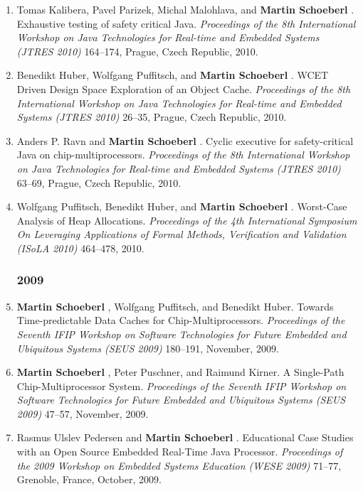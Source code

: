 \begin{enumerate}
\item Tomas Kalibera, Pavel Parizek, Michal Malohlava, and {\bf Martin Schoeberl }.
 Exhaustive testing of safety critical Java.
 \emph{Proceedings of the 8th International Workshop on Java Technologies for Real-time and Embedded Systems (JTRES 2010)} 164--174, Prague, Czech Republic, 2010.

\item Benedikt Huber, Wolfgang Puffitsch, and {\bf Martin Schoeberl }.
 WCET Driven Design Space Exploration of an Object Cache.
 \emph{Proceedings of the 8th International Workshop on Java Technologies for Real-time and Embedded Systems (JTRES 2010)} 26--35, Prague, Czech Republic, 2010.

\item Anders P. Ravn and {\bf Martin Schoeberl }.
 Cyclic executive for safety-critical Java on chip-multiprocessors.
 \emph{Proceedings of the 8th International Workshop on Java Technologies for Real-time and Embedded Systems (JTRES 2010)} 63--69, Prague, Czech Republic, 2010.

\item Wolfgang Puffitsch, Benedikt Huber, and {\bf Martin Schoeberl }.
 Worst-Case Analysis of Heap Allocations.
 \emph{Proceedings of the 4th International Symposium On Leveraging Applications of Formal Methods, Verification and Validation (ISoLA 2010)} 464--478, 2010.


\subsubsection*{2009}

\item {\bf Martin Schoeberl }, Wolfgang Puffitsch, and Benedikt Huber.
 Towards Time-predictable Data Caches for Chip-Multiprocessors.
 \emph{Proceedings of the Seventh IFIP Workshop on Software Technologies for Future Embedded and Ubiquitous Systems (SEUS 2009)} 180--191, November, 2009.

\item {\bf Martin Schoeberl }, Peter Puschner, and Raimund Kirner.
 A Single-Path Chip-Multiprocessor System.
 \emph{Proceedings of the Seventh IFIP Workshop on Software Technologies for Future Embedded and Ubiquitous Systems (SEUS 2009)} 47--57, November, 2009.

\item Rasmus Ulslev Pedersen and {\bf Martin Schoeberl }.
 Educational Case Studies with an Open Source Embedded Real-Time Java Processor.
 \emph{Proceedings of the 2009 Workshop on Embedded Systems Education (WESE 2009)} 71--77, Grenoble, France, October, 2009.


\end{enumerate}
